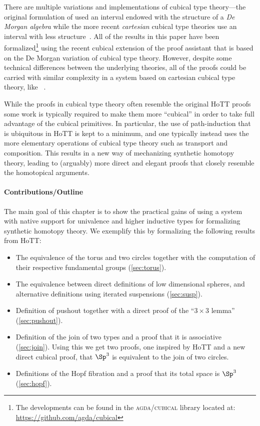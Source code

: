 There are multiple variations and implementations of cubical type
theory---the original formulation of  used an interval
endowed with the structure of a \emph{De Morgan algebra} while the
more recent \emph{cartesian} cubical type theories use an interval
with less structure~. All of the
results in this paper have been formalized\footnote{The developments
  can be found in the \textsc{agda/cubical} library located
  at:\\ \url{https://github.com/agda/cubical}} using the recent
cubical extension  of the \Agda{} proof assistant
 that is based on the De Morgan variation of cubical type
theory. However, despite some technical differences between the
underlying theories, all of the proofs could be carried with similar
complexity in a system based on cartesian cubical type theory, like
\redtt{}~.

While the proofs in cubical type theory often resemble the original
HoTT proofs some work is typically required to make them more
``cubical'' in order to take full advantage of the cubical
primitives. In particular, the use of path-induction that is
ubiquitous in HoTT is kept to a minimum, and one typically instead
uses the more elementary operations of cubical type theory such as
transport and composition. This results in a new way of mechanizing
synthetic homotopy theory, leading to (arguably) more direct and
elegant proofs that closely resemble the homotopical arguments.

\paragraph{Contributions/Outline}

The main goal of this chapter is to show the practical gains of using a
system with native support for univalence and higher inductive types
for formalizing synthetic homotopy theory. We exemplify this by
formalizing the following results from HoTT:
%
\begin{itemize}
\item The equivalence of the torus and two circles together with the
  computation of their respective fundamental groups
  (\cref{sec:torus}).
\item The equivalence between direct definitions of low dimensional
  spheres, and alternative definitions using iterated suspensions
  (\cref{sec:susp}).
\item Definition of pushout together with a direct proof of the ``$3
  \times 3$ lemma'' (\cref{sec:pushout}).
\item Definition of the join of two types and a proof that it is
  associative (\cref{sec:join}). Using this we get two proofs, one
  inspired by HoTT and a new direct cubical proof, that $\Sp^3$ is
  equivalent to the join of two circles.
\item Definitions of the Hopf fibration and a proof that its total
  space is $\Sp^3$ (\cref{sec:hopf}).
\end{itemize}

